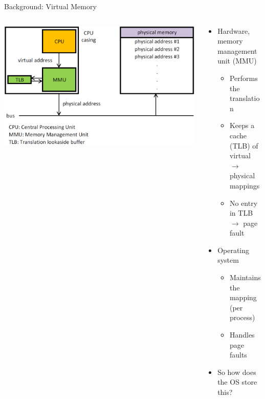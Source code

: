 \documentclass[aspectratio=169]{beamer}
\newcommand{\bi}{\begin{itemize}}
\newcommand{\ei}{\end{itemize}}
\begin{document}
\begin{frame}{Background: Virtual Memory}
  \begin{columns}[T]
    \begin{column}{0.5\textwidth}
      \vspace{-1em}
      \includegraphics[scale=0.2]{./figures/MMU.png}
    \end{column}
    \begin{column}{0.5\textwidth}
      \vspace{5em}
      \bi
    \item Hardware, memory management unit (MMU)
      \bi
    \item Performs the translation
    \item Keeps a cache (TLB) of\\virtual $\rightarrow$ physical mappings
    \item No entry in TLB $\rightarrow$ page fault
      \ei
      \pause
    \item Operating system
      \bi
    \item Maintains the mapping (per process)
    \item Handles page faults
      \ei
      \pause
    \item So how does the OS store this?
      \ei
    \end{column}
  \end{columns}
\end{frame}

\end{document}
